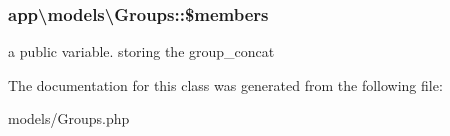 \subsubsection[{\texorpdfstring{\$members}{$members}}]{\setlength{\rightskip}{0pt plus 5cm}app\textbackslash{}models\textbackslash{}\+Groups\+::\$members}\hypertarget{classapp_1_1models_1_1Groups_a856dc426eef888fa04f70e36a3d5b93d}{}\label{classapp_1_1models_1_1Groups_a856dc426eef888fa04f70e36a3d5b93d}
a public variable. storing the group\+\_\+concat 

The documentation for this class was generated from the following file\+:\begin{DoxyCompactItemize}
\item 
models/Groups.\+php\end{DoxyCompactItemize}
